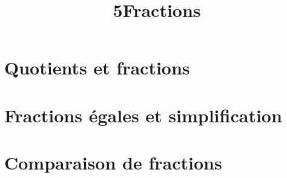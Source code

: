 \documentclass[12pt,a4paper]{article}
\date{}
\title{\textcircled{{\normalsize{5}}}Fractions}
\begin{document}
	\maketitle
	
	
	
	
	
	
	
	
	\vspace{-0.5cm}
	
	\section{Quotients et fractions}
	
	
	
	
	\section{Fractions égales et simplification}
	
	
	
	\section{Comparaison de fractions}
	
	
	
	
\end{document}
